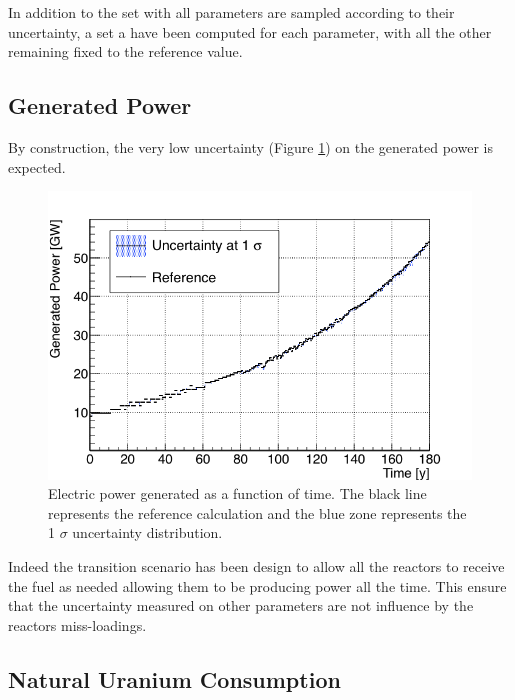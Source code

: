\documentclass{anstrans}
\begin{document}
In addition to the set with all parameters are sampled according to their
uncertainty, a set a have been computed for each parameter, with all the other
remaining fixed to the reference value.


\subsection{Generated Power}
By construction, the very low uncertainty (Figure \ref{fig:power_full}) on the
generated power is expected. 

\begin{figure}[ht] %
    \centering
    \includegraphics[scale=0.35]{power_full}
    \caption{Electric power generated as a function of time. The black line
        represents the reference calculation and the blue zone
        represents the 1 $\sigma$ uncertainty distribution.}\label{fig:power_full}
\end{figure}

Indeed the transition scenario has been design to allow
all the reactors to receive the fuel as needed allowing them to be producing
power all the time. This ensure that the uncertainty measured on other
parameters are not influence by the reactors miss-loadings.


\subsection{Natural Uranium Consumption}
\end{document}
